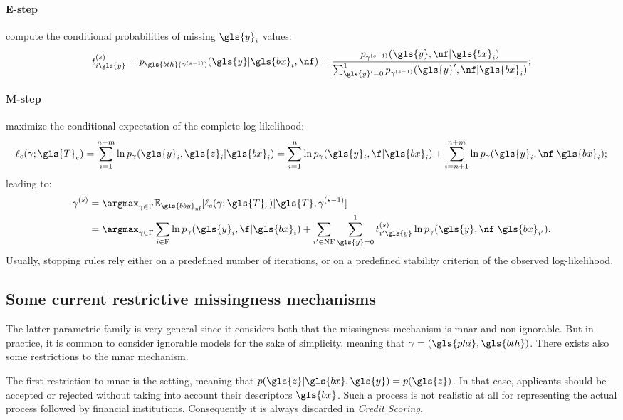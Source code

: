 \paragraph{E-step} compute the conditional probabilities of missing $\gls{y}_i$ values:
\begin{equation}
t_{i\gls{y}}^{(s)} = p_{\gls{bth}(\gamma^{(s-1)})}(\gls{y}|\gls{bx}_i,\nf) = \frac{p_{\gamma^{(s-1)}}(\gls{y}, \nf|\gls{bx}_i)}{\sum_{\gls{y}' = 0}^{1} p_{\gamma^{(s-1)}}(\gls{y}', \nf|\gls{bx}_i)};
\end{equation}
\paragraph{M-step} maximize the conditional expectation of the complete log-likelihood:
\begin{equation}\label{eq:like.c}
\ell_c(\gamma;\gls{T}_c) = \sum_{i=1}^{n+m}\ln p_{\gamma}(\gls{y}_i,\gls{z}_i | \gls{bx}_i) = \sum_{i=1}^{n}\ln p_{\gamma}(\gls{y}_i,\f | \gls{bx}_i) + \sum_{i=n+1}^{n+m}\ln p_{\gamma}(\gls{y}_i,\nf | \gls{bx}_i);
\end{equation}
leading to:
\begin{align*}
\gamma^{(s)} & = \argmax_{\gamma \in \Gamma} \mathbb{E}_{\gls{bby}_{\text{nf}}} [\ell_c(\gamma;\gls{T}_c) | \gls{T},\gamma^{(s-1)}] \\
& = \argmax_{\gamma \in \Gamma} \sum_{i\in \text{F}} \ln p_{\gamma}(\gls{y}_i, \f|\gls{bx}_i) +  \sum_{i'\in \text{NF}}\sum_{\gls{y} = 0}^{1}t_{i'\gls{y}}^{(s)} \ln p_{\gamma}(\gls{y}, \nf | \gls{bx}_{i'}).
\end{align*}
Usually, stopping rules rely either on a predefined number of iterations, or on a predefined stability criterion of the observed log-likelihood.

\subsection{Some current restrictive missingness mechanisms}
\label{sec:mechanisms}

The latter parametric family is very general since it considers both that the missingness mechanism is \gls{mnar} and non-ignorable. But in practice, it is common to consider ignorable models for the sake of simplicity, meaning that $\gamma= (\gls{phi},\gls{bth})$. There exists also some restrictions to the \gls{mnar} mechanism. 

The first restriction to \gls{mnar} is the  setting, meaning that $p(\gls{z}| \gls{bx},\gls{y}) = p(\gls{z})$. In that case, applicants should be accepted or rejected without taking into account their descriptors $\gls{bx}$. Such a process is not realistic at all for representing the actual process followed by financial institutions. Consequently it is always discarded in \textit{Credit Scoring}.

